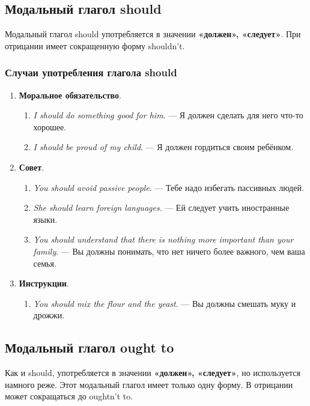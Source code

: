 \documentclass{article}
\begin{document}
\subsection{Модальный глагол \textbf{should}}

Модальный глагол should употребляется в значении \textbf{«должен», «следует»}. При отрицании имеет сокращенную форму shouldn’t.

\subsubsection{Случаи употребления глагола should}

\begin{enumerate}
	\item \textbf{Моральное обязательство}.
	\begin{enumerate}
		\item \emph{I should do something good for him}. — Я должен сделать для него что-то хорошее. 
		\item \emph{I should be proud of my child}. — Я должен гордиться своим ребёнком. 
	\end{enumerate}
	\item \textbf{Совет}.
	\begin{enumerate}
		\item \emph{You should avoid passive people}. — Тебе надо избегать пассивных людей. 
		\item \emph{She should learn foreign languages}. — Ей следует учить иностранные языки. 
		\item \emph{You should understand that there is nothing more important than your family}. — Вы должны понимать, что нет ничего более важного, чем ваша семья. 
	\end{enumerate}
	\item \textbf{Инструкции}.
	\begin{enumerate}
		\item \emph{You should mix the flour and the yeast}. — Вы должны смешать муку и дрожжи. 
	\end{enumerate}
\end{enumerate}

\subsection{Модальный глагол \textbf{ought to}}

Как и should, употребляется в значении \textbf{«должен», «следует»}, но используется намного реже. Этот модальный глагол имеет только одну форму. В отрицании может сокращаться до oughtn’t to. 
\end{document}
